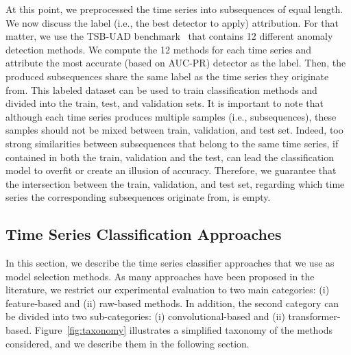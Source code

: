 At this point, we preprocessed the time series into subsequences of equal length. We now discuss the label (i.e., the best detector to apply) attribution. For that matter, we use the TSB-UAD benchmark~\cite{10.14778/3529337.3529354} that contains 12 different anomaly detection methods. We compute the 12 methods for each time series and attribute the most accurate (based on AUC-PR) detector as the label. Then, the produced subsequences share the same label as the time series they originate from. This labeled dataset can be used to train classification methods and divided into the train, test, and validation sets. It is important to note that although each time series produces multiple samples (i.e., subsequences), these samples should not be mixed between train, validation, and test set. Indeed, too strong similarities between subsequences that belong to the same time series, if contained in both the train, validation and the test, can lead the classification model to overfit or create an illusion of accuracy. Therefore, we guarantee that the intersection between the train, validation, and test set, regarding which time series the corresponding subsequences originate from, is empty.

\subsection{Time Series Classification Approaches}

In this section, we describe the time series classifier approaches that we use as model selection methods. As many approaches have been proposed in the literature, we restrict our experimental evaluation to two main categories: (i) feature-based and (ii) raw-based methods. In addition, the second category can be divided into two sub-categories: (i) convolutional-based and (ii) transformer-based.  Figure~\ref{fig:taxonomy} illustrates a simplified taxonomy of the methods considered, and we describe them in the following section.

